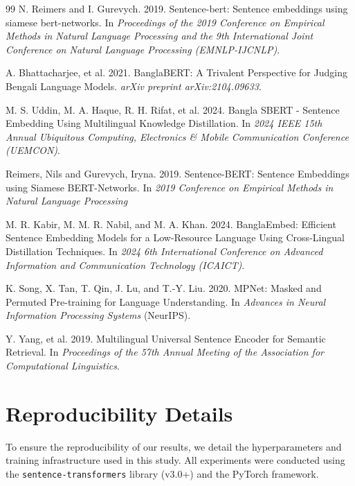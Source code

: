 \documentclass[manuscript,screen,review]{acmart}
\begin{document}
\begin{thebibliography}{99}
    N. Reimers and I. Gurevych. 2019. Sentence-bert: Sentence embeddings using siamese bert-networks. In \emph{Proceedings of the 2019 Conference on Empirical Methods in Natural Language Processing and the 9th International Joint Conference on Natural Language Processing (EMNLP-IJCNLP)}.

    A. Bhattacharjee, et al. 2021. BanglaBERT: A Trivalent Perspective for Judging Bengali Language Models. \emph{arXiv preprint arXiv:2104.09633}.

    M. S. Uddin, M. A. Haque, R. H. Rifat, et al. 2024. Bangla SBERT - Sentence Embedding Using Multilingual Knowledge Distillation. In \emph{2024 IEEE 15th Annual Ubiquitous Computing, Electronics \& Mobile Communication Conference (UEMCON)}.

    Reimers, Nils and Gurevych, Iryna. 2019. Sentence-BERT: Sentence Embeddings using Siamese BERT-Networks. In \emph{2019 Conference on Empirical Methods in Natural Language Processing}


    M. R. Kabir, M. M. R. Nabil, and M. A. Khan. 2024. BanglaEmbed: Efficient Sentence Embedding Models for a Low-Resource Language Using Cross-Lingual Distillation Techniques. In \emph{2024 6th International Conference on Advanced Information and Communication Technology (ICAICT)}.
    
    K. Song, X. Tan, T. Qin, J. Lu, and T.-Y. Liu. 2020. MPNet: Masked and Permuted Pre-training for Language Understanding. In \emph{Advances in Neural Information Processing Systems} (NeurIPS).
    
    Y. Yang, et al. 2019. Multilingual Universal Sentence Encoder for Semantic Retrieval. In \emph{Proceedings of the 57th Annual Meeting of the Association for Computational Linguistics}.

\end{thebibliography}

\appendix

\section{Reproducibility Details}

To ensure the reproducibility of our results, we detail the hyperparameters and training infrastructure used in this study. All experiments were conducted using the \texttt{sentence-transformers} library (v3.0+) and the PyTorch framework.
\end{document}
